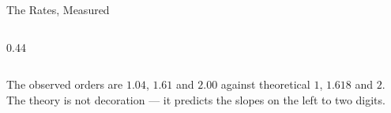 \begin{frame}{The Rates, Measured}
\begin{columns}[c]
\begin{column}{0.44\textwidth}
\begin{center}
\begin{tabularx}{\linewidth}{@{}>{\raggedright\arraybackslash}X c c@{}}
\bottomrule
\end{tabularx}
\end{center}
\vspace{1mm}
\begin{examplebox}\footnotesize
The observed orders are $1.04$, $1.61$ and $2.00$ against theoretical $1$, $1.618$ and $2$. The theory is not decoration --- it predicts the slopes on the left to two digits.
\end{examplebox}
\end{column}
\end{columns}
\vspace{1mm}
\end{frame}

